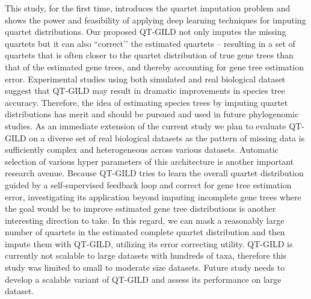 \documentclass[10pt,a4paper]{article}
\begin{document}
This study, for the first time, introduces the quartet imputation problem and shows the power and feasibility of applying deep learning techniques for imputing quartet distributions. %
Our proposed QT-GILD not only imputes the missing quartets but it can also ``correct’’ the estimated quartets -- resulting in a set of quartets that is often closer to the quartet distribution of true gene trees than that of the estimated gene trees, and thereby accounting for gene tree estimation error. Experimental studies using both simulated and real biological dataset suggest that QT-GILD may result in dramatic improvements in species tree accuracy. 
Therefore, the idea of estimating species trees by imputing  quartet distributions has merit and should be pursued and used in future phylogenomic studies. %
As an immediate extension of the current study we plan to evaluate QT-GILD on a diverse set of real biological datasets as the  pattern of missing data is sufficiently complex and heterogeneous across various datasets. Automatic selection of various hyper parameters of this architecture is another important research avenue.
Because QT-GILD tries to learn the overall quartet distribution guided by a self-supervised feedback loop and correct for gene tree estimation error, investigating its application beyond imputing incomplete gene trees where the goal would be to improve estimated gene tree distributions is another interesting direction to take. In this regard, we can mask a reasonably large number of quartets in the estimated complete quartet distribution and then impute them with QT-GILD, utilizing its error correcting utility. QT-GILD is currently not scalable to large datasets with hundreds of taxa, therefore this study was limited to small to moderate size datasets. Future study needs to develop a scalable variant of QT-GILD and assess its performance on large dataset.




% 



\appendix
\end{document}
